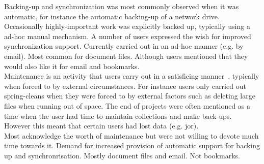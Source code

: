 \noindent
Backing-up and synchronization was most commonly observed when it was automatic, for instance the automatic backing-up of a network drive. 
Occasionally highly-important work was explicitly backed up, typically using a ad-hoc manual mechanism.
A number of users expressed the wish for improved synchronization support. Currently carried out in an ad-hoc manner (e.g. by email). Most common for document files. Although users mentioned that they would also like it for email and bookmarks.
\\

\noindent
Maintenance is an activity that users carry out in a satisficing manner~\cite{barreau:95}, typically when forced to by external circumstances.
For instance users only carried out spring-cleans when they were forced to by external factors such as deleting large files when running out of space. 
The end of projects were often mentioned as a time when the user had time to maintain collections and make back-ups.
\\

\noindent
However this meant that certain users had lost data (e.g. jor).
\\

\noindent
Most acknowledge the worth of maintenance but were not willing to devote much time towards it.  Demand for increased provision of automatic support for backing up and synchronrisation. Mostly document files and email.  Not bookmarks.
\\

